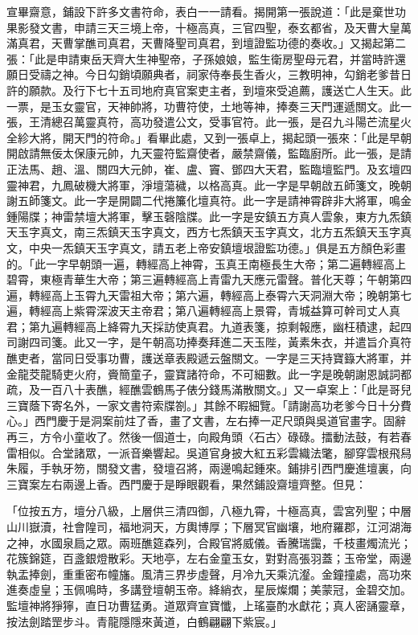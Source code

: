 \begin{showcontents}{}
宣畢齋意，鋪設下許多文書符命，表白一一請看。揭開第一張說道：「此是棄世功果影發文書，申請三天三境上帝，十極高真，三官四聖，泰玄都省，及天曹大皇萬滿真君，天曹掌醮司真君，天曹降聖司真君，到壇證監功德的奏收。」又揭起第二張：「此是申請東岳天齊大生神聖帝，子孫娘娘，監生衛房聖母元君，并當時許還願日受禱之神。今日勾銷頃願典者，祠家侍奉長生香火，三教明神，勾銷老爹昔日許的願款。及行下七十五司地府真官案吏主者，到壇來受追薦，護送亡人生天。此一票，是玉女靈官，天神帥將，功曹符使，土地等神，捧奏三天門運遞關文。此一張，王清總召萬靈真符，高功發遣公文，受事官符。此一張，是召九斗陽芒流星火全紾大將，開天門的符命。」看畢此處，又到一張卓上，揭起頭一張來：「此是早朝開啟請無佞太保康元帥，九天靈符監齋使者，嚴禁齋儀，監臨廚所。此一張，是請正法馬、趙、溫、關四大元帥，崔、盧、竇、鄧四大天君，監臨壇監門。及玄壇四靈神君，九鳳破機大將軍，淨壇蕩穢，以格高真。此一字是早朝啟五師箋文，晚朝謝五師箋文。此一字是開闢二代捲簾化壇真符。此一字是請神霄辟非大將軍，鳴金鍾陽牒；神雷禁壇大將軍，擊玉磬陰牒。此一字是安鎮五方真人雲象，東方九炁鎮天玉字真文，南三炁鎮天玉字真文，西方七炁鎮天玉字真文，北方五炁鎮天玉字真文，中央一炁鎮天玉字真文，請五老上帝安鎮壇垠證監功德。」俱是五方顏色彩畫的。「此一字早朝頭一遍，轉經高上神霄，玉真王南極長生大帝；第二遍轉經高上碧霄，東極青華生大帝；第三遍轉經高上青雷九天應元雷聲。普化天尊；午朝第四遍，轉經高上玉霄九天雷祖大帝；第六遍，轉經高上泰霄六天洞淵大帝；晚朝第七遍，轉經高上紫霄深波天主帝君；第八遍轉經高上景霄，青城益算可幹司丈人真君；第九遍轉經高上絳霄九天採訪使真君。九道表箋，掠剩報應，幽枉積逮，起四司謝四司箋。此又一字，是午朝高功捧奏拜進二天玉陛，黃素朱衣，并遣旨介真符醮吏者，當同日受事功曹，護送章表殿遞云盤關文。一字是三天持寶籙大將軍，并金龍茭龍騎吏火府，賫簡童子，靈寶諸符命，不可細數。此一字是晚朝謝恩誠詞都疏，及一百八十表醮，經醮雲鶴馬子俵分錢馬滿散關文。」又一卓案上：「此是哥兒三寶蔭下寄名外，一家文書符索牒劄。」其餘不暇細覽。「請謝高功老爹今日十分費心。」西門慶于是洞案前炷了香，畫了文書，左右捧一疋尺頭與吳道官畫字。固辭再三，方令小童收了。然後一個道士，向殿角頭〈石古〉碌碌。擂動法鼓，有若春雷相似。合堂諸眾，一派音樂響起。吳道官身披大紅五彩雲織法氅，腳穿雲根飛舄朱履，手執牙笏，關發文書，發壇召將，兩邊鳴起鍾來。鋪排引西門慶進壇裏，向三寶案左右兩邊上香。西門慶于是睜眼觀看，果然鋪設齋壇齊整。但見：

「位按五方，壇分八級，上層供三清四御，八極九霄，十極高真，雲宮列聖；中層山川嶽瀆，社會隍司，福地洞天，方輿博厚；下層冥官幽壤，地府羅郡，江河湖海之神，水國泉扃之眾。兩班醮筵森列，合殿官將威儀。香騰瑞靄，千枝畫燭流光；花簇錦筵，百盞銀燈散彩。天地亭，左右金童玉女，對對高張羽蓋；玉帝堂，兩邊執盂捧劍，重重密布幢旛。風清三界步虛聲，月冷九天乘沆瀣。金鐘撞處，高功來進奏虛皇；玉佩鳴時，多講登壇朝玉帝。絳綃衣，星辰燦爛；美蒙冠，金碧交加。監壇神將猙獰，直日功曹猛勇。道眾齊宣寶懺，上瑤臺酌水獻花；真人密誦靈章，按法劍踏罡步斗。青龍隱隱來黃道，白鶴翩翩下紫宸。」


\end{showcontents}
